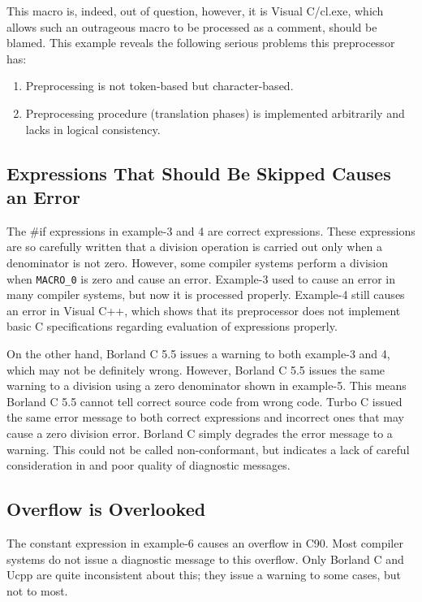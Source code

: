 \documentclass[twocolumn]{article}
\begin{document}
This macro is, indeed, out of question, however, it is Visual C/cl.exe, which allows such an outrageous macro to be processed as a comment, should be blamed.  This example reveals the following serious problems this preprocessor has:

\begin{enumerate}
\item Preprocessing is not token-based but character-based.
\item Preprocessing procedure (translation phases) is implemented arbitrarily and lacks in logical consistency.
\end{enumerate}

\subsection{Expressions That Should Be Skipped Causes an Error}

The \#if expressions in example-3 and 4 are correct expressions.  These expressions are so carefully written that a division operation is carried out only when a denominator is not zero.  However, some compiler systems perform a division when \verb|MACRO_0| is zero and cause an error.  Example-3 used to cause an error in many compiler systems, but now it is processed properly.  Example-4 still causes an error in Visual C++, which shows that its preprocessor does not implement basic C specifications regarding evaluation of expressions properly.

On the other hand, Borland C 5.5 issues a warning to both example-3 and 4, which may not be definitely wrong.  However, Borland C 5.5 issues the same warning to a division using a zero denominator shown in example-5.  This means Borland C 5.5 cannot tell correct source code from wrong code.  Turbo C issued the same error message to both correct expressions and incorrect ones that may cause a zero division error.  Borland C simply degrades the error message to a warning.  This could not be called non-conformant, but indicates a lack of careful consideration in and poor quality of diagnostic messages.

\subsection{Overflow is Overlooked}

The constant expression in example-6 causes an overflow in C90.  Most compiler systems do not issue a diagnostic message to this overflow.  Only Borland C and Ucpp are quite inconsistent about this; they issue a warning to some cases, but not to most.
\end{document}

